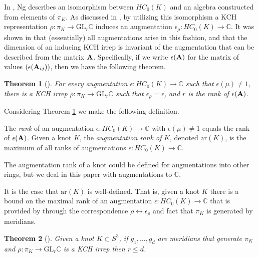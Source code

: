 \documentclass[11pt]{amsart}
\def\C{{\mathbb C}}
\newtheorem{thm}{Theorem}[section]
\newenvironment{definition}[1][Definition]{\begin{trivlist}
\item[\hskip \labelsep {\bfseries #1}]}{\end{trivlist}}
\newenvironment{rem}[1][Remark]{\begin{trivlist}
\item[\hskip \labelsep {\bfseries #1}]}{\end{trivlist}}
\begin{document}
  In \cite{Ng08}, Ng describes an isomorphism between $HC_0(K)$ and an algebra constructed from elements of $\pi_K$. As discussed in \cite{Ng12}, by utilizing this isomorphism a KCH representation $\rho:\pi_K\to\text{GL}_r\C$ induces an augmentation $\epsilon_\rho:HC_0(K)\to\C$. It was shown in \cite{Cor13b} that (essentially) all augmentations arise in this fashion, and that the dimension of an inducing KCH irrep is invariant of the augmentation that can be described from the matrix ${\bf A}$. Specifically, if we write $\epsilon({\bf A})$ for the matrix of values $(\epsilon({\bf A}_{ij}))$, then we have the following theorem.

  \begin{thm}[\cite{Cor13b}]
  For every augmentation $\epsilon:HC_0(K)\to\C$ such that $\epsilon(\mu)\ne 1$, there is a KCH irrep $\rho:\pi_K\to\text{GL}_r\C$ such that $\epsilon_\rho=\epsilon$, and $r$ is the rank of $\epsilon({\bf A})$.
  \label{thm:AugKCH_Corresp}
  \end{thm}

  Considering Theorem \ref{thm:AugKCH_Corresp} we make the following definition.

  \begin{definition}
  The \emph{rank} of an augmentation $\epsilon:HC_0(K)\to\C$ with $\epsilon(\mu)\ne 1$ equals the rank of $\epsilon({\bf A})$. Given a knot $K$, the \emph{augmentation rank of } $K$, denoted $\text{ar}(K)$, is the maximum of all ranks of augmentations $\epsilon:HC_0(K)\to\C$.
  \label{defn:AugRk}
  \end{definition}

  \begin{rem} The augmentation rank of a knot could be defined for augmentations into other rings, but we deal in this paper with augmentations to $\C$.
  \end{rem}

  It is the case that $\text{ar}(K)$ is well-defined. That is, given a knot $K$ there is a bound on the maximal rank of an augmentation $\epsilon:HC_0(K)\to\C$ that is provided by through the correspondence $\rho\leftrightarrow\epsilon_\rho$ and fact that $\pi_K$ is generated by meridians.

  \begin{thm}[\cite{Cor13a}] Given a knot $K\subset S^3$, if $g_1,\ldots,g_d$ are meridians that generate $\pi_K$ and $\rho:\pi_K\to\text{GL}_r\C$ is a KCH irrep then $r\le d$.
  \label{thm:DimBound}
  \end{thm}
\end{document}
